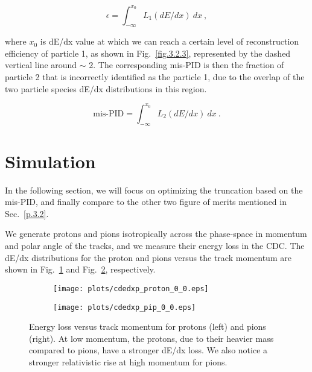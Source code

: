 \begin{equation}
    \label{eq.3.3.2.1}
    \epsilon = \int_{-\infty}^{x_{0}} L_{1}(dE/dx)~dx~,
\end{equation}

\noindent where $x_{0}$ is dE/dx value at which we can reach a certain level of reconstruction efficiency of particle 1, as shown in Fig.~\ref{fig.3.2.3}, represented by the dashed vertical line around $\sim$ 2. The corresponding mis-PID is then the fraction of particle 2 that is incorrectly identified as the particle 1, due to the overlap of the two particle species dE/dx distributions in this region. 

\begin{equation}
    \label{eq.3.3.2}
    \mbox{mis-PID} = \int_{-\infty}^{x_{0}} L_{2}(dE/dx)~dx~.
\end{equation}

\section{Simulation}
\label{p.3.3}

In the following section, we will focus on optimizing the truncation based on the mis-PID, and finally compare to the other two figure of merits mentioned in Sec.~\ref{p.3.2}.
~\par We generate protons and pions isotropically across the phase-space in momentum and polar angle of the tracks, and we measure their energy loss in the CDC. The dE/dx distributions for the proton and pions versus the track momentum are shown in Fig.~\ref{fig.3.4.a} and Fig.~\ref{fig.3.4.b}, respectively.

\begin{figure}[H]
    \centering
    \begin{subfigure}[b]{0.5\textwidth}
        \texttt{[image: plots/cdedxp\_proton\_0\_0.eps]}
        \caption{}
        \label{fig.3.4.a} 
    \end{subfigure}\hfill
    \begin{subfigure}[b]{0.5\textwidth}
        \texttt{[image: plots/cdedxp\_pip\_0\_0.eps]}
        \caption{}
        \label{fig.3.4.b} 
    \end{subfigure}
    \caption{Energy loss versus track momentum for protons (left) and pions (right). At low momentum, the protons, due to their heavier mass compared to pions, have a stronger dE/dx loss. We also notice a stronger relativistic rise at high momentum for pions.}
    \label{fig.3.4}
\end{figure}

